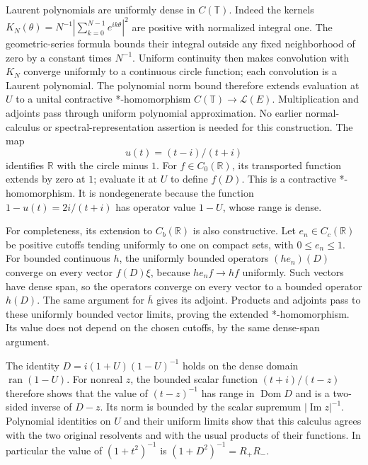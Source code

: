 \documentclass[
  11pt,
]{article}
\begin{document}
Laurent polynomials are uniformly dense in \(C(\mathbb T)\). Indeed the
kernels \(K_N(\theta)=N^{-1}|\sum_{k=0}^{N-1}e^{ik\theta}|^2\) are
positive with normalized integral one. The geometric-series formula
bounds their integral outside any fixed neighborhood of zero by a
constant times \(N^{-1}\). Uniform continuity then makes convolution
with \(K_N\) converge uniformly to a continuous circle function; each
convolution is a Laurent polynomial. The polynomial norm bound therefore
extends evaluation at \(U\) to a unital contractive *-homomorphism
\(C(\mathbb T)\to\mathcal L(E)\). Multiplication and adjoints pass
through uniform polynomial approximation. No earlier normal-calculus or
spectral-representation assertion is needed for this construction. The
map \[
u(t)=(t-i)/(t+i)
\] identifies \(\mathbb R\) with the circle minus \(1\). For
\(f\in C_0(\mathbb R)\), its transported function extends by zero at
\(1\); evaluate it at \(U\) to define \(f(D)\). This is a contractive
*-homomorphism. It is nondegenerate because the function
\(1-u(t)=2i/(t+i)\) has operator value \(1-U\), whose range is dense.

For completeness, its extension to \(C_b(\mathbb R)\) is also
constructive. Let \(e_n\in C_c(\mathbb R)\) be positive cutoffs tending
uniformly to one on compact sets, with \(0\leq e_n\leq1\). For bounded
continuous \(h\), the uniformly bounded operators \((he_n)(D)\) converge
on every vector \(f(D)\xi\), because \(he_nf\to hf\) uniformly. Such
vectors have dense span, so the operators converge on every vector to a
bounded operator \(h(D)\). The same argument for \(\overline h\) gives
its adjoint. Products and adjoints pass to these uniformly bounded
vector limits, proving the extended *-homomorphism. Its value does not
depend on the chosen cutoffs, by the same dense-span argument.

The identity \(D=i(1+U)(1-U)^{-1}\) holds on the dense domain
\(\operatorname{ran}(1-U)\). For nonreal \(z\), the bounded scalar
function \((t+i)/(t-z)\) therefore shows that the value of
\((t-z)^{-1}\) has range in \(\operatorname{Dom}D\) and is a two-sided
inverse of \(D-z\). Its norm is bounded by the scalar supremum
\(|\operatorname{Im}z|^{-1}\). Polynomial identities on \(U\) and their
uniform limits show that this calculus agrees with the two original
resolvents and with the usual products of their functions. In particular
the value of \((1+t^2)^{-1}\) is \((1+D^2)^{-1}=R_+R_-\).
\end{document}

